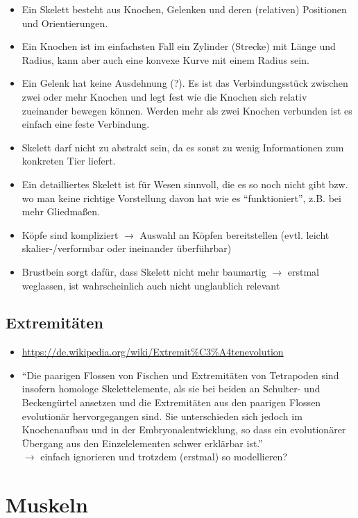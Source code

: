 \begin{itemize}
 \item Ein Skelett besteht aus Knochen, Gelenken und deren (relativen) Positionen und Orientierungen.
 \item Ein Knochen ist im einfachsten Fall ein Zylinder (Strecke) mit Länge und Radius, kann aber auch eine konvexe Kurve mit einem Radius sein.
 \item Ein Gelenk hat keine Ausdehnung (?). Es ist das Verbindungsstück zwischen zwei oder mehr Knochen und legt fest wie die Knochen sich relativ zueinander bewegen können. Werden mehr als zwei Knochen verbunden ist es einfach eine feste Verbindung.
 \item Skelett darf nicht zu abstrakt sein, da es sonst zu wenig Informationen zum konkreten Tier liefert.
 \item Ein detailliertes Skelett ist für Wesen sinnvoll, die es so noch nicht gibt bzw. wo man keine richtige Vorstellung davon hat wie es "`funktioniert"', z.B. bei mehr Gliedmaßen.
 \item Köpfe sind kompliziert $\rightarrow$ Auswahl an Köpfen bereitstellen (evtl. leicht skalier-/verformbar oder ineinander überführbar)
 \item Brustbein sorgt dafür, dass Skelett nicht mehr baumartig $\rightarrow$ erstmal weglassen, ist wahrscheinlich auch nicht unglaublich relevant
\end{itemize}

\subsection{Extremitäten}

\begin{itemize}
 \item \url{https://de.wikipedia.org/wiki/Extremit\%C3\%A4tenevolution}
 \item "`Die paarigen Flossen von Fischen und Extremitäten von Tetrapoden sind insofern homologe Skelettelemente, als sie bei beiden an Schulter- und Beckengürtel ansetzen und die Extremitäten aus den paarigen Flossen evolutionär hervorgegangen sind.\cite{homology} Sie unterschieden sich jedoch im Knochenaufbau und in der Embryonalentwicklung, so dass ein evolutionärer Übergang aus den Einzelelementen schwer erklärbar ist."'\\
 $\rightarrow$ einfach ignorieren und trotzdem (erstmal) so modellieren?
\end{itemize}


\section{Muskeln}

